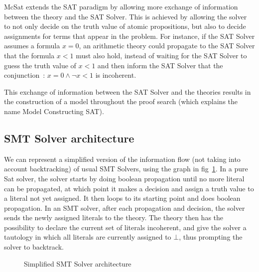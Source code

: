 \documentclass{article}
\begin{document}
McSat extends the SAT paradigm by allowing more exchange of information between the theory
and the SAT Solver. This is achieved by allowing the solver to not only decide on the truth value
of atomic propositions, but also to decide assignments for terms that appear in the problem.
For instance, if the SAT Solver assumes a formula $x = 0$,
an arithmetic theory could propagate to the SAT Solver that the formula $x < 1$ must also hold,
instead of waiting for the SAT Solver to guess the truth value of $x < 1$ and then
inform the SAT Solver that the conjunction~: $x = 0 \land \neg x < 1$ is incoherent.

This exchange of information between the SAT Solver and the theories results in
the construction of a model throughout the proof search (which explains the name
Model Constructing SAT).

\subsection{SMT Solver architecture}

We can represent a simplified version of the information flow (not taking into
account backtracking) of usual SMT Solvers, using the graph in fig~\ref{fig:smt_flow}.
In a pure Sat solver, the solver starts by doing
boolean propagation until no more literal can be propagated, at which point it
makes a decision and assign a truth value to a literal not yet assigned. It then
loops to its starting point and does boolean propagation. In an SMT solver,
after each propagation and decision, the solver sends the newly assigned literals
to the theory. The theory then has the possibility to declare the current set of
literals incoherent, and give the solver a tautology in which all literals are currently
assigned to $\bot$, thus prompting the solver to backtrack.

\begin{figure}
  \begin{center}
  \end{center}
  \caption{Simplified SMT Solver architecture}\label{fig:smt_flow}
\end{figure}
\end{document}
